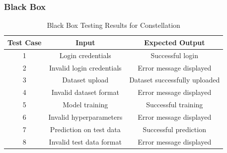 \documentclass[12pt,a4paper]{report}     %
\begin{document}
\begin{normalsize}
{{{{\subsubsection{Black Box}
\begin{table}[h]
\centering
\caption{Black Box Testing Results for Constellation}
\label{tab:blackbox-results}
\begin{tabular}{|c|c|c|}
\hline
\textbf{Test Case} & \textbf{Input} & \textbf{Expected Output} \\ \hline
1 & Login credentials & Successful login \\ \hline
2 & Invalid login credentials & Error message displayed \\ \hline
3 & Dataset upload & Dataset successfully uploaded \\ \hline
4 & Invalid dataset format & Error message displayed \\ \hline
5 & Model training & Successful training \\ \hline
6 & Invalid hyperparameters & Error message displayed \\ \hline
7 & Prediction on test data & Successful prediction \\ \hline
8 & Invalid test data format & Error message displayed \\ \hline
\end{tabular}
\end{table}

}}}}
\end{normalsize}
\end{document}

